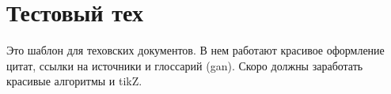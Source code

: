 \section{Тестовый тех}
\begin{grayquote}
	Это шаблон для теховских документов. В нем работают красивое оформление цитат, ссылки на источники \autocite{GAN} и глоссарий (\gls{gan}). Скоро должны заработать красивые алгоритмы и tikZ.
\end{grayquote}

